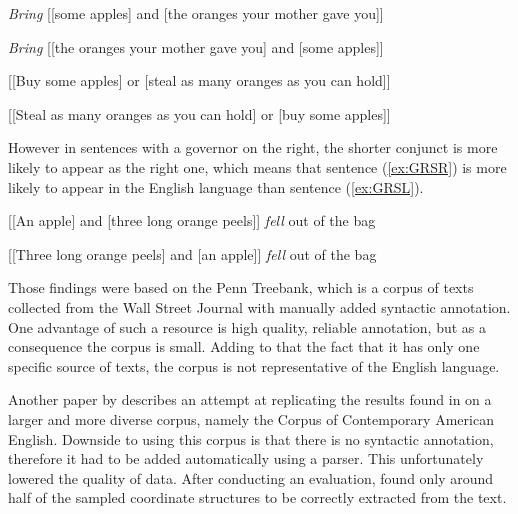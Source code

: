 \begin{exe}

\ex\label{ex:GL}
\begin{xlist}
\ex\label{ex:GLSL}
\textsl{Bring} [[some apples] and [the oranges your mother gave you]]

\ex\label{ex:GLSR}
\textsl{Bring} [[the oranges your mother gave you] and [some apples]]
\end{xlist}

\ex\label{ex:GN}
\begin{xlist}
\ex\label{ex:GNSL}
[[Buy some apples] or [steal as many oranges as you can hold]]

\ex\label{ex:GNSR}
[[Steal as many oranges as you can hold] or [buy some apples]]
\end{xlist}

\end{exe}

However in sentences with a governor on the right, the shorter conjunct is more likely to appear as the right one, which means that sentence (\ref{ex:GRSR}) is more likely to appear in the English language than sentence (\ref{ex:GRSL}).

\begin{exe}

\ex\label{ex:GR}
\begin{xlist}
\ex\label{ex:GRSL}
[[An apple] and [three long orange peels]] \textsl{fell} out of the bag

\ex\label{ex:GRSR}
[[Three long orange peels] and [an apple]] \textsl{fell} out of the bag
\end{xlist}

\end{exe}

Those findings were based on the Penn Treebank, which is a corpus of texts collected from the Wall Street Journal with manually added syntactic annotation. One advantage of such a resource is high quality, reliable annotation, but as a consequence the corpus is small. Adding to that the fact that it has only one specific source of texts, the corpus is not representative of the English language. 

Another paper by \cite{pbg2023} describes an attempt at replicating the results found in \cite{prz:woz:23} on a larger and more diverse corpus, namely the Corpus of Contemporary American English. Downside to using this corpus is that there is no syntactic annotation, therefore it had to be added automatically using a parser. This unfortunately lowered the quality of data. After conducting an evaluation, \cite{pbg2023} found only around half of the sampled coordinate structures to be correctly extracted from the text. 

